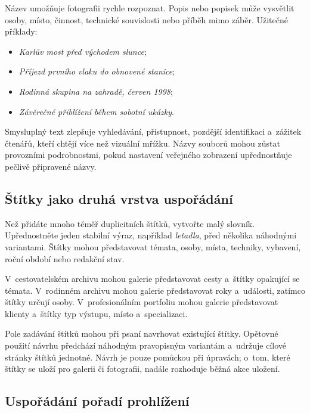 \documentclass[11pt,a4paper]{article}
\begin{document}
Název umožňuje fotografii rychle rozpoznat. Popis nebo popisek může vysvětlit
osoby, místo, činnost, technické souvislosti nebo příběh mimo záběr. Užitečné
příklady:

\begin{itemize}
  \item \emph{Karlův most před východem slunce};
  \item \emph{Příjezd prvního vlaku do obnovené stanice};
  \item \emph{Rodinná skupina na zahradě, červen 1998};
  \item \emph{Závěrečné přiblížení během sobotní ukázky}.
\end{itemize}

Smysluplný text zlepšuje vyhledávání, přístupnost, pozdější identifikaci
a~zážitek čtenářů, kteří chtějí více než vizuální mřížku. Názvy souborů mohou
zůstat provozními podrobnostmi, pokud nastavení veřejného zobrazení
upřednostňuje pečlivě připravené názvy.

\subsection{Štítky jako druhá vrstva uspořádání}

Než přidáte mnoho téměř duplicitních štítků, vytvořte malý slovník.
Upřednostněte jeden stabilní výraz, například \emph{letadla}, před několika
náhodnými variantami. Štítky mohou představovat témata, osoby, místa, techniky,
vybavení, roční období nebo redakční stav.

V~cestovatelském archivu mohou galerie představovat cesty a~štítky opakující se
témata. V~rodinném archivu mohou galerie představovat roky a~události, zatímco
štítky určují osoby. V~profesionálním portfoliu mohou galerie představovat
klienty a~štítky typ výstupu, místo a~specializaci.

Pole zadávání štítků mohou při psaní navrhovat existující štítky. Opětovné
použití návrhu předchází náhodným pravopisným variantám a~udržuje cílové stránky
štítků jednotné. Návrh je pouze pomůckou při úpravách; o~tom, které štítky se
uloží pro galerii či fotografii, nadále rozhoduje běžná akce uložení.

\subsection{Uspořádání pořadí prohlížení}
\end{document}
